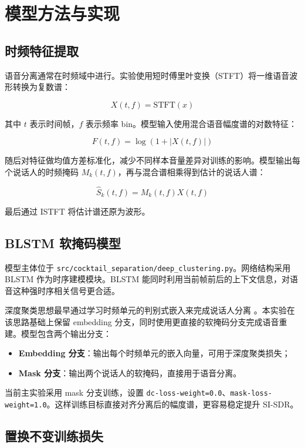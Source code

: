\section{模型方法与实现}

\subsection{时频特征提取}

语音分离通常在时频域中进行。实验使用短时傅里叶变换（STFT）将一维语音波形转换为复数谱：

\[
X(t, f) = \mathrm{STFT}(x)
\]

其中 $t$ 表示时间帧，$f$ 表示频率 bin。模型输入使用混合语音幅度谱的对数特征：

\[
F(t, f) = \log(1 + |X(t, f)|)
\]

随后对特征做均值方差标准化，减少不同样本音量差异对训练的影响。模型输出每个说话人的时频掩码 $M_k(t,f)$，再与混合谱相乘得到估计的说话人谱：

\[
\hat{S}_k(t,f) = M_k(t,f)X(t,f)
\]

最后通过 ISTFT 将估计谱还原为波形。

\subsection{BLSTM 软掩码模型}

模型主体位于 \texttt{src/cocktail\_separation/deep\_clustering.py}。网络结构采用 BLSTM 作为时序建模模块。BLSTM 能同时利用当前帧前后的上下文信息，对语音这种强时序相关信号更合适。

深度聚类思想最早通过学习时频单元的判别式嵌入来完成说话人分离 \cite{hershey2016deep}。本实验在该思路基础上保留 embedding 分支，同时使用更直接的软掩码分支完成语音重建。模型包含两个输出分支：

\begin{itemize}
    \item \textbf{Embedding 分支}：输出每个时频单元的嵌入向量，可用于深度聚类损失；
    \item \textbf{Mask 分支}：输出两个说话人的软掩码，直接用于语音分离。
\end{itemize}

当前主实验采用 mask 分支训练，设置 \texttt{dc-loss-weight=0.0}、\texttt{mask-loss-weight=1.0}。这样训练目标直接对齐分离后的幅度谱，更容易稳定提升 SI-SDR。

\subsection{置换不变训练损失}

